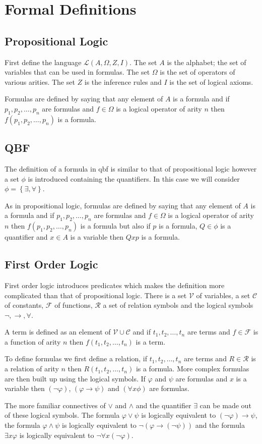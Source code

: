 \chapter{Formal Definitions} \label{formaldefinitions}

\section{Propositional Logic}
First define the language $\mathcal{L}(A, \Omega, Z, I)$. The set $A$ is the alphabet; the set of variables that can be used in formulas. The set $\Omega$ is the set of operators of various arities. The set $Z$ is the inference rules and $I$ is the set of logical axioms.

Formulas are defined by saying that any element of $A$ is a formula and if $p_1,p_2,\dotsc,p_n$ are formulas and $f \in \Omega$ is a logical operator of arity $n$ then $f(p_1,p_2,\dotsc,p_n)$ is a formula.

\section{QBF}
The definition of a formula in \gls{qbf} is similar to that of propositional logic however a set $\phi$ is introduced containing the quantifiers. In this case we will consider $\phi=\left \{\exists, \forall\right \}$. 

As in propositional logic, formulas are defined by saying that any element of $A$ is a formula and if $p_1,p_2,\dotsc,p_n$ are formulas and $f \in \Omega$ is a logical operator of arity $n$ then $f(p_1,p_2,\dotsc,p_n)$ is a formula but also if $p$ is a formula, $Q \in \phi$ is a quantifier and $x \in A$ is a variable then $Qx p$ is a formula.

\section{First Order Logic}
First order logic introduces predicates which makes the definition more complicated than that of propositional logic. There is a set $\mathcal{V}$ of variables, a set $\mathcal{C}$ of constants, $\mathcal{F}$ of functions, $\mathcal{R}$ a set of relation symbols and the logical symbols $\neg, \to, \forall$. 

A term is defined as an element of $\mathcal{V} \cup \mathcal{C}$ and if $t_1,t_2,\dotsc,t_n$ are terms and $f\in\mathcal{F}$ is a function of arity $n$ then $f(t_1,t_2,\dotsc,t_n)$ is a term.

To define formulas we first define a relation, if $t_1,t_2,\dotsc,t_n$ are terms and $R\in\mathcal{R}$ is a relation of arity $n$ then $R(t_1,t_2,\dotsc,t_n)$ is a formula. More complex formulas are then built up using the logical symbols. If $\varphi$ and $\psi$ are formulas and $x$ is a variable then $(\neg\varphi)$, $(\varphi\to\psi)$ and $(\forall x\phi)$ are formulas.

The more familiar connectives of $\lor$ and $\land$ and the quantifier $\exists$ can be made out of these logical symbols. The formula $\varphi\lor\psi$ is logically equivalent to $(\neg\varphi)\to\psi$, the formula $\varphi\land\psi$ is logically equivalent to $\neg(\varphi\to(\neg\psi))$ and the formula $\exists x \varphi$ is logically equivalent to $\neg\forall x(\neg\varphi)$.
